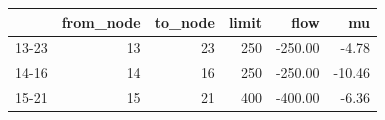 \begin{tabular}{lrrrrr}
\toprule
 & from\_node & to\_node & limit & flow & mu \\
\midrule
13-23 & 13 & 23 & 250 & -250.00 & -4.78 \\
14-16 & 14 & 16 & 250 & -250.00 & -10.46 \\
15-21 & 15 & 21 & 400 & -400.00 & -6.36 \\
\bottomrule
\end{tabular}

